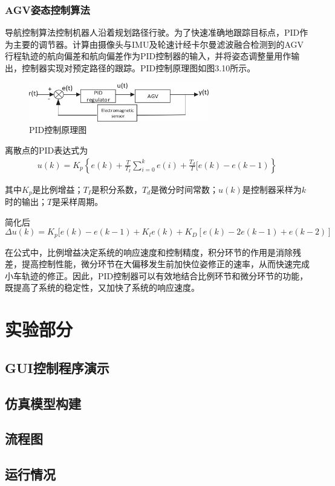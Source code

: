 \documentclass[cs4size,a4paper]{ctexart}
\numberwithin{equation}{section}
\numberwithin{table}{section}
\numberwithin{figure}{section}
\begin{document}
\subsubsection{AGV姿态控制算法}
导航控制算法控制机器人沿着规划路径行驶。为了快速准确地跟踪目标点，PID作为主要的调节器\cite{8623691}。计算由摄像头与IMU及轮速计经卡尔曼滤波融合检测到的AGV行程轨迹的航向偏差和航向偏差作为PID控制器的输入，并将姿态调整量用作输出，控制器实现对预定路径的跟踪。PID控制原理图如图3.10所示。
\begin{figure}[H]
    \centering
    \includegraphics[width=0.7\textwidth]{figure/PIDcontroller.jpg}
    \caption{PID控制原理图}
\end{figure}
离散点的PID表达式为
\begin{align}
    u(k)=K_{p} \left\{e(k)+\frac{T}{T_{I}}\sum\limits_{i=0}^{k}e(i)+\frac{T_{d}}{T}[e(k)-e(k-1)\right\}
\end{align}

其中$K_{p}$是比例增益；$T_{I}$是积分系数，$T_{d}$是微分时间常数；$u(k)$是控制器采样为$k$时的输出；$T$是采样周期。

简化后
\begin{equation*}
    \Delta u(k)=K_{p}[e(k)-e(k-1)+K_{l}e(k)+K_{D}[e(k)-2e(k-1)+e(k-2)]
\end{equation*}

在公式中，比例增益决定系统的响应速度和控制精度，积分环节的作用是消除残差，提高控制性能，微分环节在大偏移发生前加快位姿修正的速率，从而快速完成小车轨迹的修正。因此，PID控制器可以有效地结合比例环节和微分环节的功能，既提高了系统的稳定性，又加快了系统的响应速度。

\section{实验部分}

\subsection{GUI控制程序演示}

\subsection{仿真模型构建}

\subsection{流程图}

\subsection{运行情况}

\end{document}
